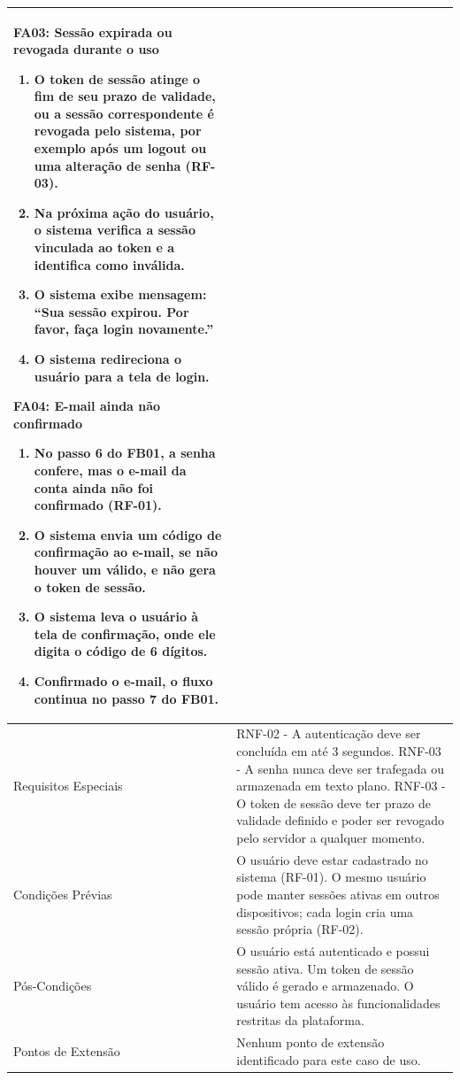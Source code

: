 \begin{longtable}{ >{\raggedright}p{2.8cm} | >{\raggedright\arraybackslash}p{10.7cm} }
\textbf{FA03:} Sessão expirada ou revogada durante o uso
\vspace{2pt}
\begin{enumerate}[nosep,leftmargin=1.2em,topsep=0pt,partopsep=0pt,parsep=0pt,itemsep=0pt,after=\vspace{2pt}]
    \item O token de sessão atinge o fim de seu prazo de validade, ou a sessão correspondente é revogada pelo sistema, por exemplo após um logout ou uma alteração de senha (RF-03).
    \item Na próxima ação do usuário, o sistema verifica a sessão vinculada ao token e a identifica como inválida.
    \item O sistema exibe mensagem: ``Sua sessão expirou. Por favor, faça login novamente.''
    \item O sistema redireciona o usuário para a tela de login.
\end{enumerate}

\textbf{FA04:} E-mail ainda não confirmado
\vspace{2pt}
\begin{enumerate}[nosep,leftmargin=1.2em,topsep=0pt,partopsep=0pt,parsep=0pt,itemsep=0pt,after=\vspace{2pt}]
    \item No passo 6 do FB01, a senha confere, mas o e-mail da conta ainda não foi confirmado (RF-01).
    \item O sistema envia um código de confirmação ao e-mail, se não houver um válido, e não gera o token de sessão.
    \item O sistema leva o usuário à tela de confirmação, onde ele digita o código de 6 dígitos.
    \item Confirmado o e-mail, o fluxo continua no passo 7 do FB01.
\end{enumerate}
\mbox{} \\ \hline

Requisitos Especiais & RNF-02 - A autenticação deve ser concluída em até 3 segundos. RNF-03 - A senha nunca deve ser trafegada ou armazenada em texto plano. RNF-03 - O token de sessão deve ter prazo de validade definido e poder ser revogado pelo servidor a qualquer momento. \\ \hline

Condições Prévias & O usuário deve estar cadastrado no sistema (RF-01). O mesmo usuário pode manter sessões ativas em outros dispositivos; cada login cria uma sessão própria (RF-02). \\ \hline

Pós-Condições & O usuário está autenticado e possui sessão ativa. Um token de sessão válido é gerado e armazenado. O usuário tem acesso às funcionalidades restritas da plataforma. \\ \hline

Pontos de Extensão & Nenhum ponto de extensão identificado para este caso de uso. \\
\end{longtable}
\renewcommand{\arraystretch}{1}
\FloatBarrier


